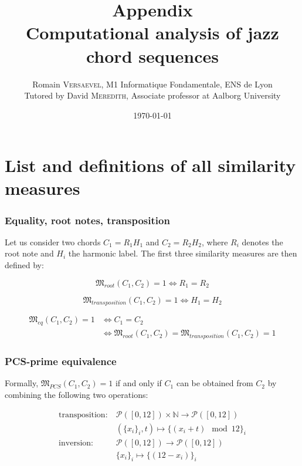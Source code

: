 \documentclass[a4paper,10pt]{article}
\title{ \Large Appendix \\ \LARGE Computational analysis of jazz chord sequences}
\author{\normalsize Romain \textsc{Versaevel}, M1 Informatique Fondamentale, ENS de Lyon \\ \normalsize Tutored by David \textsc{Meredith}, Associate professor at Aalborg University\\}
\date{\today}
\begin{document}
\maketitle
\tableofcontents
\newpage


\section{List and definitions of all similarity measures}

\subsubsection*{Equality, root notes, transposition}

Let us consider two chords $C_1 = R_1 H_1$ and $C_2 = R_2 H_2$, where $R_i$ denotes the root note and $H_i$ the harmonic label.
The first three similarity measures are then defined by:

\begin{equation*}
\mathfrak{M}_{root}(C_1,C_2) = 1 \Leftrightarrow R_1 = R_2
\end{equation*}

\begin{equation*}
\mathfrak{M}_{transposition}(C_1,C_2) = 1 \Leftrightarrow H_1 = H_2
\end{equation*}

\begin{align*}
\mathfrak{M}_{eq}(C_1,C_2) = 1 & \Leftrightarrow C_1 = C_2 \\
& \Leftrightarrow \mathfrak{M}_{root}(C_1,C_2) = \mathfrak{M}_{transposition}(C_1,C_2) = 1
\end{align*}


\subsubsection*{PCS-prime equivalence}

Formally, $\mathfrak{M}_{PCS}(C_1,C_2) = 1$ if and only if $C_1$ can be obtained from $C_2$ by combining the following two operations:

\begin{align*}
\text{transposition} :~& \mathcal{P}([0,12])\times\mathbb{N} \longrightarrow \mathcal{P}([0,12]) \\
 & (\{x_i\}_i, t) \longmapsto \{(x_i+t)\mod 12\}_i \\
\text{inversion} :~& \mathcal{P}([0,12]) \longrightarrow \mathcal{P}([0,12]) \\
 & \{x_i\}_i \longmapsto \{(12-x_i)\}_i
\end{align*}
\end{document}
